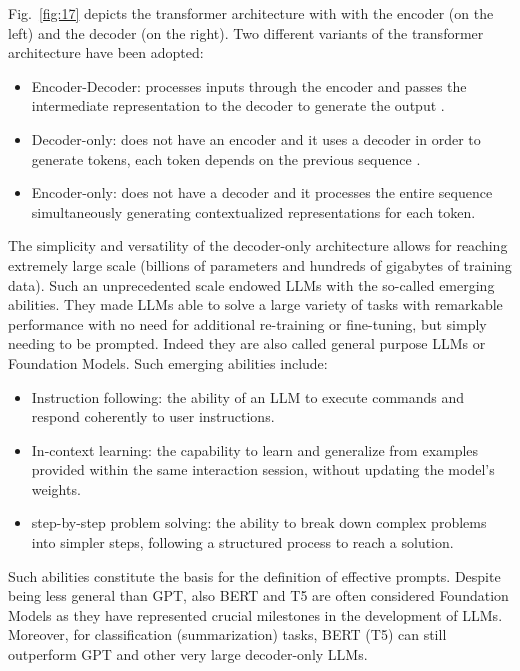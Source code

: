 Fig.~\ref{fig:17} depicts the transformer architecture with with the encoder (on the left) and the decoder (on the right).
Two different variants of the transformer architecture have been adopted:
\begin{itemize}
    \item Encoder-Decoder: processes inputs through the encoder and passes the intermediate representation to the decoder to generate the output \cite{encoder_medium}.

    \item Decoder-only: does not have an encoder and it uses a decoder in order to generate tokens, each token depends on the previous sequence \cite{uniteai_decoder}.

    \item Encoder-only: does not have a decoder and it processes the entire sequence simultaneously generating contextualized representations for each token\cite{ewer2024entp}.
\end{itemize}

The simplicity and versatility of the decoder-only architecture allows for reaching extremely large scale (billions of parameters and hundreds of gigabytes of training data).
Such an unprecedented scale endowed LLMs with the so-called emerging abilities.
They made LLMs able to solve a large variety of tasks with remarkable performance with no need for additional re-training or fine-tuning, but simply needing to be prompted.
Indeed they are also called general purpose LLMs or Foundation Models.
Such emerging abilities include:
\begin{itemize}
    \item Instruction following: the ability of an LLM to execute commands and respond coherently to user instructions.

    \item In-context learning: the capability to learn and generalize from examples provided within the same interaction session, without updating the model’s weights.

    \item step-by-step problem solving: the ability to break down complex problems into simpler steps, following a structured process to reach a solution.
\end{itemize}
Such abilities constitute the basis for the definition of effective prompts.
Despite being less general than GPT, also BERT and T5 are often considered Foundation Models as they have represented crucial milestones in the development of LLMs.
Moreover, for classification (summarization) tasks, BERT (T5) can still outperform GPT and other very large decoder-only LLMs.

